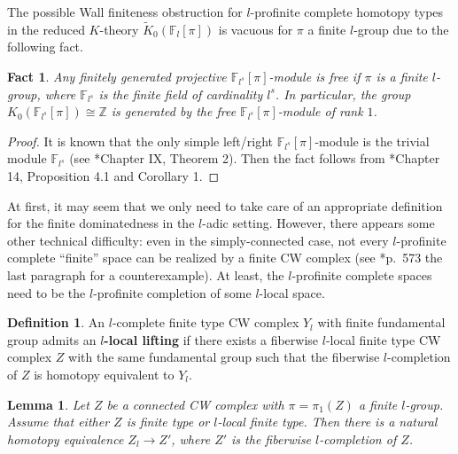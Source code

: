 \documentclass[11pt]{amsart}
\newtheorem{lemma}[theorem]{Lemma}
\newtheorem{fact}[theorem]{Fact}
\theoremstyle{definition}
\newtheorem{definition}[theorem]{Definition}
\numberwithin{equation}{section}
\numberwithin{equation}{section}
\newcommand\ZZ{\mathbb{Z}}
\newcommand\FF{\mathbb{F}}
\begin{document}
The possible Wall finiteness obstruction for $l$-profinite complete homotopy types in the reduced $K$-theory $\widetilde{K}_0(\FF_l[\pi])$ is vacuous for $\pi$ a finite $l$-group due to the following fact.

\begin{fact}\label{Fact: Projective Modules are Free}\label{cor: k0 is z}
Any finitely generated projective $\FF_{l^s}[\pi]$-module is free if $\pi$ is a finite $l$-group, where $\FF_{l^s}$ is the finite field of cardinality $l^s$.
In particular, the group $K_0(\FF_{l^s}[\pi])\cong \ZZ$ is generated by the free $\FF_{l^s}[\pi]$-module of rank $1$.
\end{fact}

\begin{proof}
It is known that the only simple left/right $\FF_{l^s}[\pi]$-module is the trivial module $\FF_{l^s}$ (see \cite{Serre-local-fields}*{Chapter IX, Theorem 2}). Then the fact follows from \cite{Serre-representation-finite-groups}*{Chapter 14, Proposition 4.1 and Corollary 1}.
\end{proof}

At first, it may seem that we only need to take care of an appropriate definition for the finite dominatedness in the $l$-adic setting.
However, there appears some other technical difficulty: even in the simply-connected case, not every $l$-profinite complete ``finite'' space can be realized by a finite CW complex (see \cite{Victor-Wilkerson-Counterexample-p-completion}*{p.~573 the last paragraph} for a counterexample). At least, the $l$-profinite complete spaces need to be the $l$-profinite completion of some $l$-local space. 

\begin{definition}\label{Def: l-local lifting}
An $l$-complete finite type CW complex $Y_l$ with finite fundamental group admits an \textbf{$l$-local lifting} if there exists a fiberwise $l$-local finite type CW complex $Z$ with the same fundamental group such that the fiberwise $l$-completion of $Z$ is homotopy equivalent to $Y_l$.
\end{definition}

\begin{lemma}
Let $Z$ be a connected CW complex with $\pi=\pi_1(Z)$ a finite $l$-group. Assume that either $Z$ is finite type or $l$-local finite type. Then there is a natural homotopy equivalence $Z_l\rightarrow Z'$, where $Z'$ is the fiberwise $l$-completion of $Z$.
\end{lemma}
\end{document}
